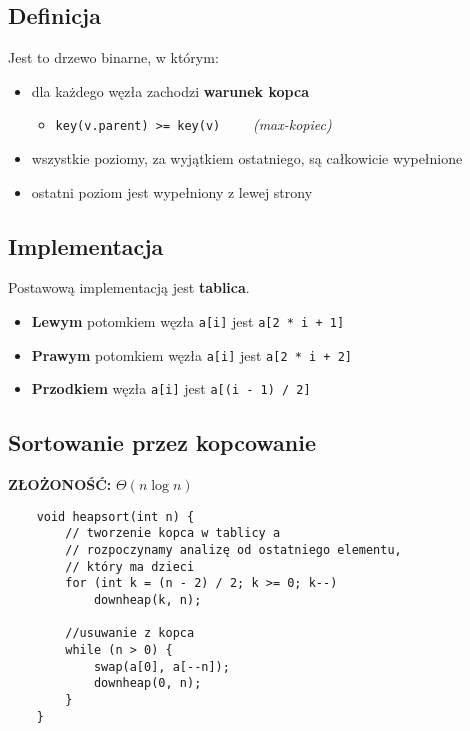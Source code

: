 \documentclass[algorytmy.tex]{subfiles}
\begin{document}
\subsection{Definicja}
    Jest to drzewo binarne, w którym:
    \begin{itemize}
        \item dla każdego węzła zachodzi \textbf{warunek kopca}
        \begin{itemize}
            \item \texttt{key(v.parent) >= key(v)}  ~~~~\textit{(max-kopiec)}
        \end{itemize}
        \item wszystkie poziomy, za wyjątkiem ostatniego, są całkowicie
              wypełnione
        \item ostatni poziom jest wypełniony z lewej strony
\end{itemize}

\subsection{Implementacja}
    Postawową implementacją jest \textbf{tablica}.
    \begin{itemize}
        \item \textbf{Lewym} potomkiem węzła \texttt{a[i]} jest
              \texttt{a[2 * i + 1]}
        \item \textbf{Prawym} potomkiem węzła \texttt{a[i]} jest
              \texttt{a[2 * i + 2]}
        \item \textbf{Przodkiem} węzła \texttt{a[i]} jest \texttt{a[(i - 1) / 2]}
    \end{itemize}


\subsection{Sortowanie przez kopcowanie}

        \textbf{ZŁOŻONOŚĆ:  } $\Theta(n \log{n})$
\begin{verbatim}
    void heapsort(int n) {
        // tworzenie kopca w tablicy a
        // rozpoczynamy analizę od ostatniego elementu,
        // który ma dzieci
        for (int k = (n - 2) / 2; k >= 0; k--)
            downheap(k, n);

        //usuwanie z kopca
        while (n > 0) {
            swap(a[0], a[--n]);
            downheap(0, n);
        }
    }
\end{verbatim}
\end{document}
